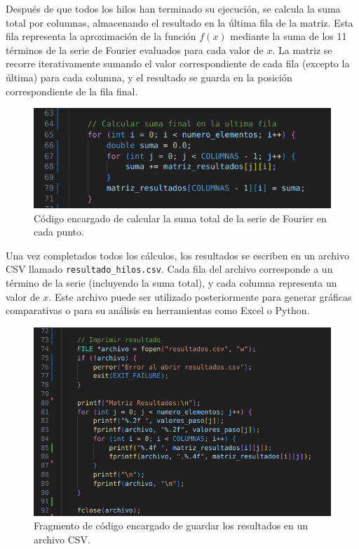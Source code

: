 {Después de que todos los hilos han terminado su ejecución, se calcula la suma total por columnas, almacenando el resultado en la última fila de la matriz. Esta fila representa la aproximación de la función $f(x)$ mediante la suma de los 11 términos de la serie de Fourier evaluados para cada valor de $x$. La matriz se recorre iterativamente sumando el valor correspondiente de cada fila (excepto la última) para cada columna, y el resultado se guarda en la posición correspondiente de la fila final.

\begin{figure}[H]
    \centering
    \includegraphics[width=0.9\linewidth]{Figures/fase4/suma_total_fase4.png}
    \caption{Código encargado de calcular la suma total de la serie de Fourier en cada punto.}
    \label{fig:suma-total-fase4}
\end{figure}

Una vez completados todos los cálculos, los resultados se escriben en un archivo CSV llamado \texttt{resultado\_hilos.csv}. Cada fila del archivo corresponde a un término de la serie (incluyendo la suma total), y cada columna representa un valor de $x$. Este archivo puede ser utilizado posteriormente para generar gráficas comparativas o para su análisis en herramientas como Excel o Python.

\begin{figure}[H]
    \centering
    \includegraphics[width=0.9\linewidth]{Figures/fase4/guardar_csv_fase4.png}
    \caption{Fragmento de código encargado de guardar los resultados en un archivo CSV.}
    \label{fig:guardar-csv-fase4}
\end{figure}

}
